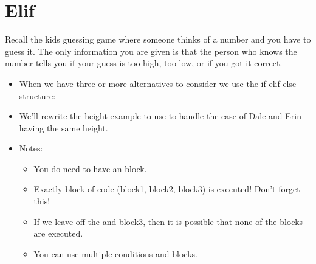 \documentclass[letterpaper,10pt,english]{sphinxmanual}
\begin{document}
\section{Elif}
\label{\detokenize{lecture_notes/lec06_conditionals1:elif}}
Recall the kids guessing game where someone thinks of a number and you
have to guess it. The only information you are given is that the person
who knows the number tells you if your guess is too high, too low, or if
you got it correct.
\begin{itemize}
\item {} 
When we have three or more alternatives to consider we use the
if-elif-else structure:

%
\begin{sphinxVerbatim}[commandchars=\\\{\}]
 
 
\end{sphinxVerbatim}

\item {} 
We’ll rewrite the height example to use  to handle the case of Dale
and Erin having the same height.

\item {} 
Notes:
\begin{itemize}
\item {} 
You do  need to have an  block.

\item {} 
Exactly  block of code (block1, block2, block3) is
executed!  Don’t forget this!

\item {} 
If we leave off the  and block3, then it is possible that
none of the blocks are executed.

\item {} 
You can use multiple  conditions and blocks.

\end{itemize}

\end{itemize}
\end{document}
